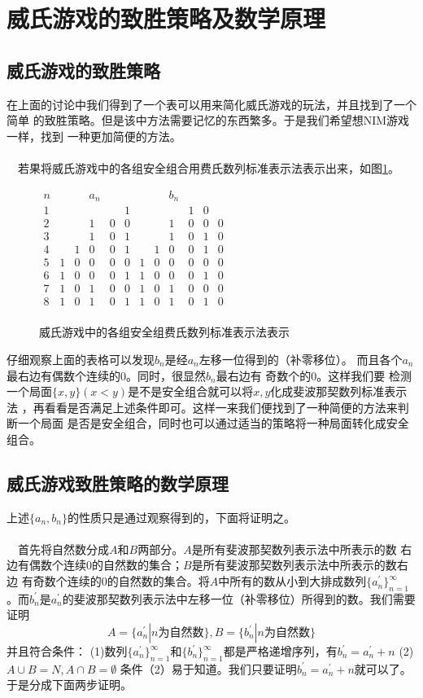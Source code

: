 \documentclass[UTF8,nofonts,cs4size]{ctexrep}
\begin{document}
\section{威氏游戏的致胜策略及数学原理}
\subsection{威氏游戏的致胜策略}
在上面的讨论中我们得到了一个表可以用来简化威氏游戏的玩法，并且找到了一个简单
的致胜策略。但是该中方法需要记忆的东西繁多。于是我们希望想NIM游戏一样，找到
一种更加简便的方法。
\paragraph{}
\indent\ \
若果将威氏游戏中的各组安全组合用费氏数列标准表示法表示出来，如图\ref{wiff}。
\begin{figure}[htp]
\centering
$
\begin{array}{cccccccccccc}
n&\ &\ &a_n&\ &\ &\ &\ &b_n&\ &\ &\ \\
1&\ &\ &\ &\ &1&\ &\ &\ &1&0&\ \\
2&\ &\ &1&0&0&\ &\ &1&0&0&0 \\
3&\ &\ &1&0&1&\ &\ &1&0&1&0\\
4&\ &1&0&0&1&\ &1&0&0&1&0\\
5&1&0&0&0&0&1&0&0&0&0&0\\
6&1&0&0&0&1&1&0&0&0&1&0\\
7&1&0&1&0&0&1&0&1&0&0&0\\
8&1&0&1&0&1&1&0&1&0&1&0\\
\end{array}
$
\caption{威氏游戏中的各组安全组费氏数列标准表示法表示}
\label{wiff}
\end{figure}

仔细观察上面的表格可以发现$b_n$是经$a_n$左移一位得到的（补零移位）。
而且各个$a_n$最右边有偶数个连续的0。同时，很显然$b_n$最右边有
奇数个的0。这样我们要
检测一个局面$\{x,y\}(x<y)$是不是安全组合就可以将$x,y$化成斐波那契数列标准表示法
，再看看是否满足上述条件即可。这样一来我们便找到了一种简便的方法来判断一个局面
是否是安全组合，同时也可以通过适当的策略将一种局面转化成安全组合。
\subsection{威氏游戏致胜策略的数学原理}
上述$\{a_n,b_n\}$的性质只是通过观察得到的，下面将证明之。
\paragraph{}
\indent\ \
首先将自然数分成$A$和$B$两部分。$A$是所有斐波那契数列表示法中所表示的数
右边有偶数个连续0的自然数的集合；$B$是所有斐波那契数列表示法中所表示的数右边
有奇数个连续的0的自然数的集合。将$A$中所有的数从小到大排成数列$\{a_{n}^{'}\}_{n=1}^{\infty}$
。而$b_{n}^{'}$是$a_{n}^{'}$的斐波那契数列表示法中左移一位（补零移位）所得到的数。我们需要证明
\[
A=\{a_{n}^{'}|n\mbox{为自然数}\},B=\{b_{n}^{'}|n\mbox{为自然数}\}
\]
并且符合条件：
\newline
(1)数列$\{a_{n}^{'}\}_{n=1}^{\infty}$和$\{b_{n}^{'}\}_{n=1}^{\infty}$都是严格递增序列，有$b_{n}^{'}=a_{n}^{'}+n$
\newline
(2)$A\cup B = N, A\cap B = \emptyset $
条件（2）易于知道。我们只要证明$b_{n}^{'}=a_{n}^{'}+n$就可以了。于是分成下面两步证明。
\end{document}
